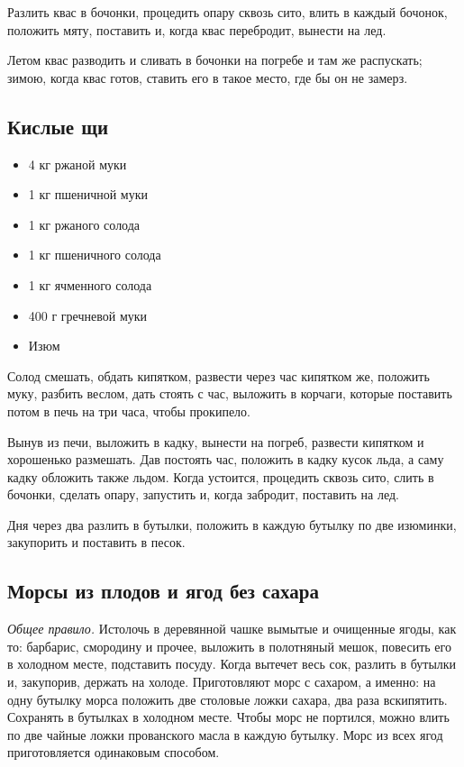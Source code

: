 Разлить квас в бочонки, процедить опару сквозь сито, влить в каждый бочонок, положить мяту, поставить и, когда квас перебродит, вынести на лед.

Летом квас разводить и сливать в бочонки на погребе и там же распускать; зимою, когда квас готов, ставить его в такое место, где бы он не замерз.

\subsection{Кислые щи}

\begin{itemize}
	\item 4 кг ржаной муки 
    \item 1 кг пшеничной муки
    \item 1 кг ржаного солода
    \item 1 кг пшеничного солода
    \item 1 кг ячменного солода 
    \item 400 г гречневой муки 
    \item Изюм
\end{itemize}

Солод смешать, обдать кипятком, развести через час кипятком же, положить муку, разбить веслом, дать стоять с час, выложить в корчаги, которые поставить потом в печь на три часа, чтобы прокипело.

Вынув из печи, выложить в кадку, вынести на погреб, развести кипятком и хорошенько размешать. Дав постоять час, положить в кадку кусок льда, а саму кадку обложить также льдом. Когда устоится, процедить сквозь сито, слить в бочонки, сделать опару, запустить и, когда забродит, поставить на лед.

Дня через два разлить в бутылки, положить в каждую бутылку по две изюминки, закупорить и поставить в песок.

\subsection{Морсы из плодов и ягод без сахара}

\emph{Общее правило.} Истолочь в деревянной чашке вымытые и очищенные ягоды, как то: барбарис, смородину и прочее, выложить в полотняный мешок, повесить его в холодном месте, подставить посуду. Когда вытечет весь сок, разлить в бутылки и, закупорив, держать на холоде. Приготовляют морс с сахаром, а именно: на одну бутылку морса положить две столовые ложки сахара, два раза вскипятить. Сохранять в бутылках в холодном месте. Чтобы морс не портился, можно влить по две чайные ложки прованского масла в каждую бутылку. Морс из всех ягод приготовляется одинаковым способом.

